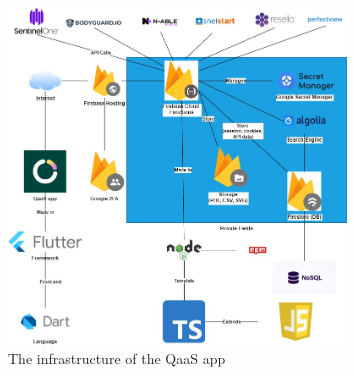 \begin{figure}[htbp]
      \centering
      \includegraphics[width=0.8\textwidth]{Figures/QaaS App Infraastructure.jpg}
      \caption{The infrastructure of the QaaS app}
\end{figure}

